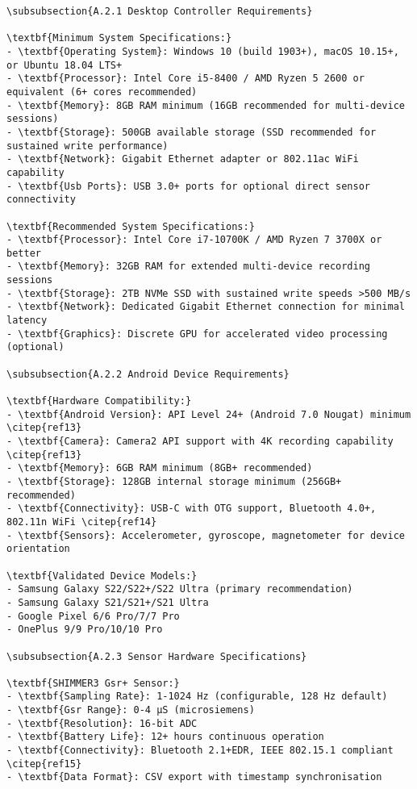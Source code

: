 \begin{verbatim}
\subsubsection{A.2.1 Desktop Controller Requirements}

\textbf{Minimum System Specifications:}
- \textbf{Operating System}: Windows 10 (build 1903+), macOS 10.15+, or Ubuntu 18.04 LTS+
- \textbf{Processor}: Intel Core i5-8400 / AMD Ryzen 5 2600 or equivalent (6+ cores recommended)
- \textbf{Memory}: 8GB RAM minimum (16GB recommended for multi-device sessions)
- \textbf{Storage}: 500GB available storage (SSD recommended for sustained write performance)
- \textbf{Network}: Gigabit Ethernet adapter or 802.11ac WiFi capability
- \textbf{Usb Ports}: USB 3.0+ ports for optional direct sensor connectivity

\textbf{Recommended System Specifications:}
- \textbf{Processor}: Intel Core i7-10700K / AMD Ryzen 7 3700X or better
- \textbf{Memory}: 32GB RAM for extended multi-device recording sessions
- \textbf{Storage}: 2TB NVMe SSD with sustained write speeds >500 MB/s
- \textbf{Network}: Dedicated Gigabit Ethernet connection for minimal latency
- \textbf{Graphics}: Discrete GPU for accelerated video processing (optional)

\subsubsection{A.2.2 Android Device Requirements}

\textbf{Hardware Compatibility:}
- \textbf{Android Version}: API Level 24+ (Android 7.0 Nougat) minimum \citep{ref13}
- \textbf{Camera}: Camera2 API support with 4K recording capability \citep{ref13}
- \textbf{Memory}: 6GB RAM minimum (8GB+ recommended)
- \textbf{Storage}: 128GB internal storage minimum (256GB+ recommended)
- \textbf{Connectivity}: USB-C with OTG support, Bluetooth 4.0+, 802.11n WiFi \citep{ref14}
- \textbf{Sensors}: Accelerometer, gyroscope, magnetometer for device orientation

\textbf{Validated Device Models:}
- Samsung Galaxy S22/S22+/S22 Ultra (primary recommendation)
- Samsung Galaxy S21/S21+/S21 Ultra
- Google Pixel 6/6 Pro/7/7 Pro
- OnePlus 9/9 Pro/10/10 Pro

\subsubsection{A.2.3 Sensor Hardware Specifications}

\textbf{SHIMMER3 Gsr+ Sensor:}
- \textbf{Sampling Rate}: 1-1024 Hz (configurable, 128 Hz default)
- \textbf{Gsr Range}: 0-4 μS (microsiemens)
- \textbf{Resolution}: 16-bit ADC
- \textbf{Battery Life}: 12+ hours continuous operation
- \textbf{Connectivity}: Bluetooth 2.1+EDR, IEEE 802.15.1 compliant \citep{ref15}
- \textbf{Data Format}: CSV export with timestamp synchronisation


\end{verbatim}
